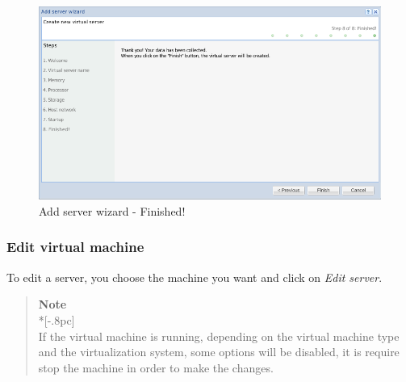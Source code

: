 \begin{description}
		\begin{figure}[H]
			\begin{center}
			\includegraphics[scale=0.5]{screenshots/server_createwiz_finish.png}
			\caption{Add server wizard - Finished!}
			\label{fig:server_createwiz_finish}
			\end{center}
		\end{figure}

\end{description}

\subsubsection{Edit virtual machine}
\label{sec:edit_server}
To edit a server, you choose the machine you want and click on \emph{Edit server}.

    \begin{quote}
        {\large \bf Note} \\*[-.8pc]
        \underline{\hspace{6in}} \\
        If the virtual machine is running, depending on the virtual machine type and the virtualization system, some options will be disabled, it is require stop the machine in order to make the changes.
    \end{quote}

